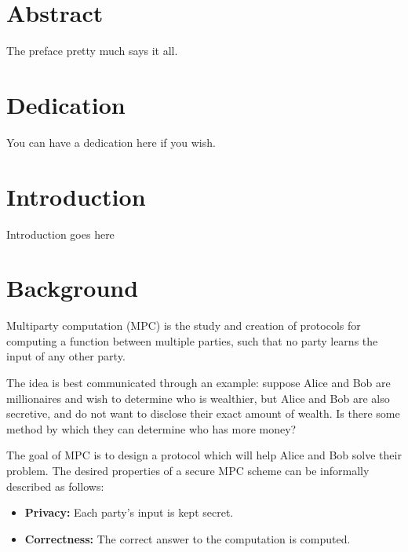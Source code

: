 \documentclass[12pt,twoside]{reedthesis}
\begin{document}
    \tableofcontents
    \listoftables
    \listoffigures

    \chapter*{Abstract}
	The preface pretty much says it all.
	
	\chapter*{Dedication}
	You can have a dedication here if you wish.

  \mainmatter %
  \pagestyle{fancyplain} %


\chapter*{Introduction}

 Introduction goes here

\chapter{Background}

Multiparty computation (MPC) is the study and creation of protocols for computing a function between multiple parties, such that no party learns the input of any other party.

The idea is best communicated through an example: suppose Alice and Bob are millionaires and wish to determine who is wealthier, but Alice and Bob are also secretive, and do not want to disclose their exact amount of wealth. 
Is there some method by which they can determine who has more money?

The goal of MPC is to design a protocol which will help Alice and Bob solve their problem.
The desired properties of a secure MPC scheme can be informally described as follows:
\begin{itemize}
    \item \textbf{Privacy:} Each party's input is kept secret.
    \item \textbf{Correctness:} The correct answer to the computation is computed.
\end{itemize}
\end{document}
